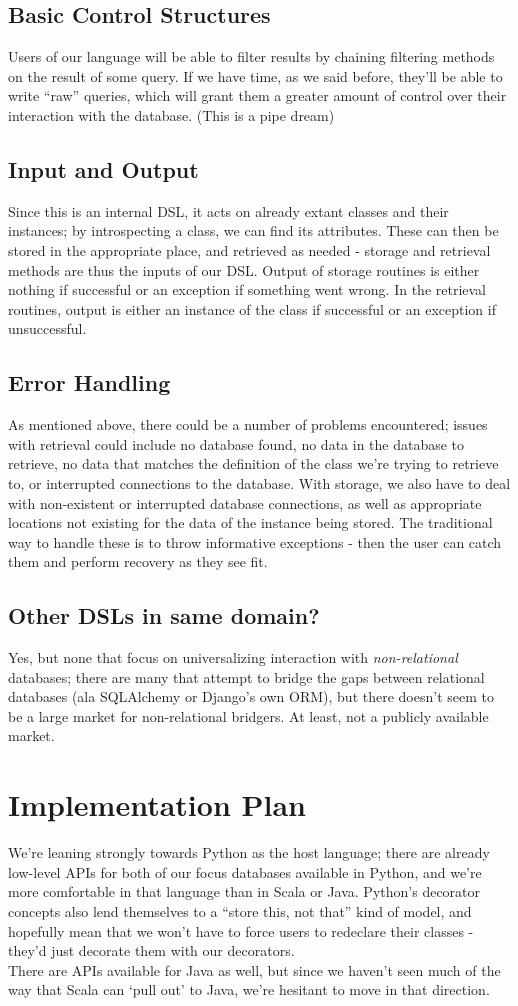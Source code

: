 \documentclass{article} %
\begin{document}
\subsection{Basic Control Structures}
Users of our language will be able to filter results by chaining filtering methods on the result of some query. If we have time, as we said before,
they'll be able to write ``raw'' queries, which will grant them a greater amount of control over their interaction with the database. (This is a pipe dream)
\subsection{Input and Output}
Since this is an internal DSL, it acts on already extant classes and their instances; by introspecting a class, we can find its attributes.
These can then be stored in the appropriate place, and retrieved as needed - storage and retrieval methods are thus the inputs of our
DSL. Output of storage routines is either nothing if successful or an exception if something went wrong. In the retrieval routines, output is
either an instance of the class if successful or an exception if unsuccessful.
\subsection{Error Handling}
As mentioned above, there could be a number of problems encountered; issues with retrieval could include no database found, no data in the database
to retrieve, no data that matches the definition of the class we're trying to retrieve to, or interrupted connections to the database. With storage, we also
have to deal with non-existent or interrupted database connections, as well as appropriate locations not existing for the data of the instance being stored.
The traditional way to handle these is to throw informative exceptions - then the user can catch them and perform recovery as they see fit.
\subsection{Other DSLs in same domain?}
Yes, but none that focus on universalizing interaction with \emph{non-relational} databases; there are many that attempt to bridge the gaps between
relational databases (ala SQLAlchemy or Django's own ORM), but there doesn't seem to be a large market for non-relational bridgers. At least, not a
publicly available market.
\section{Implementation Plan}
We're leaning strongly towards Python as the host language; there are already low-level APIs for both of our focus databases available in Python, and we're
more comfortable in that language than in Scala or Java. Python's decorator concepts also lend themselves to a ``store this, not that'' kind of model, and 
hopefully mean that we won't have to force users to redeclare their classes - they'd just decorate them with our decorators.\\
There are APIs available for Java as well, but since we haven't seen much of the way that Scala can `pull out' to Java, we're hesitant to move in that direction.
\end{document}

